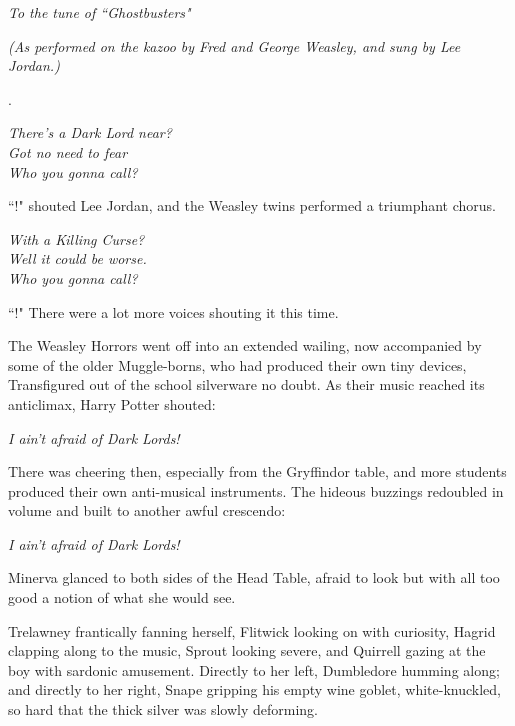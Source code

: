 \begin{center}
\emph{To the tune of ``Ghostbusters"}

\emph{(As performed on the kazoo by Fred and George Weasley, and sung by Lee Jordan.)}

.

\emph{There's a Dark Lord near?\\
Got no need to fear\\
Who you gonna call?}
\end{center}

``!" shouted Lee Jordan, and the Weasley twins performed a triumphant chorus.

\begin{center}
\emph{With a Killing Curse?\\
Well it could be worse.\\
Who you gonna call?}
\end{center}

``!" There were a lot more voices shouting it this time.

The Weasley Horrors went off into an extended wailing, now accompanied by some of the older Muggle-borns, who had produced their own tiny devices, Transfigured out of the school silverware no doubt. As their music reached its anticlimax, Harry Potter shouted:

\begin{center}
\emph{I ain't afraid of Dark Lords!}
\end{center}

There was cheering then, especially from the Gryffindor table, and more students produced their own anti-musical instruments. The hideous buzzings redoubled in volume and built to another awful crescendo:

\begin{center}
\emph{I ain't afraid of Dark Lords!}
\end{center}

Minerva glanced to both sides of the Head Table, afraid to look but with all too good a notion of what she would see.

Trelawney frantically fanning herself, Flitwick looking on with curiosity, Hagrid clapping along to the music, Sprout looking severe, and Quirrell gazing at the boy with sardonic amusement. Directly to her left, Dumbledore humming along; and directly to her right, Snape gripping his empty wine goblet, white-knuckled, so hard that the thick silver was slowly deforming.

